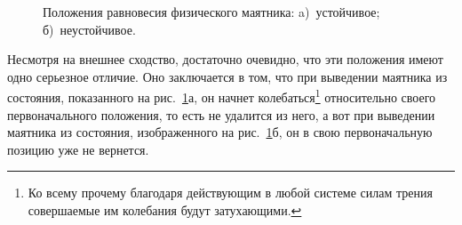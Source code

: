\documentclass[12pt,a4paper,openany]{extarticle}
\begin{document}
\begin{figure}[h]
	\begin{minipage}[h]{0.49\linewidth}
	\end{minipage}
	\hfill
	\begin{minipage}[h]{0.49\linewidth}
	\end{minipage}
	\caption{Положения равновесия физического маятника: a)~устойчивое; б)~неустойчивое.}
	\label{pendulum}
\end{figure}

Несмотря на внешнее сходство, достаточно очевидно, что эти положения имеют одно серьезное отличие.
Оно заключается в том, что при выведении маятника из состояния, показанного на рис.~\ref{pendulum}а, он начнет колебаться\footnote{Ко всему прочему благодаря действующим в любой системе силам трения совершаемые им колебания будут затухающими.} относительно своего первоначального положения, то есть не удалится из него, а вот при выведении маятника из состояния, изображенного на рис.~\ref{pendulum}б, он в свою первоначальную позицию уже не вернется.
\end{document}
